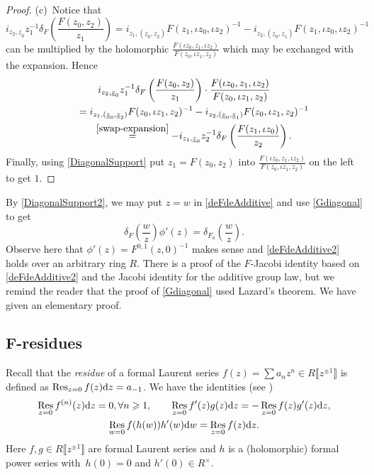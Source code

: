 \documentclass[pdftex]{sigma}
\numberwithin{equation}{section}
\theoremstyle{definition}
\DeclareMathOperator\Res{Res}
\def\lb{\llbracket}
\def\rb{\rrbracket}
\begin{document}
\begin{proof}
(c)~Notice that
\[
 i_{z_2,\underline z_0}z_1^{-1}\delta_F\left(\frac{F(z_0,z_2)}{z_1}\right)
=i_{z_1,(\underline z_0, \underline z_2)}F(z_1,\iota z_0,\iota z_2)^{-1} - i_{z_2,(\underline z_0, \underline z_1)}F(z_1,\iota z_0, \iota z_2)^{-1}
\]
can be multiplied by the holomorphic $\frac{F(\iota z_0,z_1,\iota z_2)}{F(z_0, \iota z_1, z_2)}$ which may be exchanged with the expansion. Hence
\begin{gather*}
 i_{z_2,\underline z_0}z_1^{-1}\delta_F\left(\frac{F(z_0,z_2)}{z_1}\right)\cdot\frac{F(\iota z_0,z_1,\iota z_2)}{F(z_0, \iota z_1, z_2)}\\
\qquad=i_{z_1,(\underline z_0, \underline z_2)}F(z_0,\iota z_1, z_2)^{-1} - i_{z_2,(\underline z_0, \underline z_1)}F(z_0,\iota z_1, z_2)^{-1}\\
\qquad\overset{\eqref{swap-expansion}}{=}-i_{z_1,\underline z_0}z_2^{-1}\delta_F\left(\frac{F(z_1,\iota z_0)}{z_2}\right).
\end{gather*}
Finally, using \eqref{DiagonalSupport} put $z_1=F(z_0,z_2)$ into $\frac{F(\iota z_0,z_1,\iota z_2)}{F(z_0, \iota z_1, z_2)}$ on the left to get $1$.
\end{proof}

By \eqref{DiagonalSupport2}, we may put $z=w$ in \eqref{deFdeAdditive} and use \eqref{Gdiagonal} to get
\begin{equation}
\label{deFdeAdditive2}
 \delta_F\left(\frac{w}{z}\right)\phi'(z)=\delta_{F_a}\left(\frac{w}{z}\right).
\end{equation}
Observe here that $\phi'(z)=F^{0,1}(z,0)^{-1}$ makes sense and \eqref{deFdeAdditive2} holds over an arbitrary ring $R$. There is a proof of the $F$-Jacobi identity based on \eqref{deFdeAdditive2} and the Jacobi identity for the additive group law, but we remind the reader that the proof of \eqref{Gdiagonal} used Lazard's theorem. We have given an elementary proof.

\subsection[F-residues]{$\boldsymbol{F}$-residues}
\label{s37}

Recall that the \emph{residue} of a formal Laurent series $f(z)=\sum a_nz^n\in R\big\lb z^{\pm1}\big\rb$ is defined as $\Res_{z=0} f(z){\rm d}z=a_{-1}$. We have the identities (see \cite[Chapter~13]{Rem})
\begin{gather}%
\Res_{z=0} f^{(n)}(z){\rm d}z=0, \forall n\geqslant1,\qquad
\Res_{z=0} f'(z)g(z){\rm d}z=-\Res_{z=0} f(z)g'(z){\rm d}z,\nonumber\\
\Res_{w=0} f(h(w))h'(w){\rm d}w=\Res_{z=0} f(z){\rm d}z.\label{s2eqn3}
\end{gather}
Here $f,g\in R\big\lb z^{\pm1}\big\rb$ are formal Laurent series and $h$ is a (holomorphic) formal power series with~${h(0)=0}$ and $h'(0)\in R^\times$.\medskip
\end{document}
